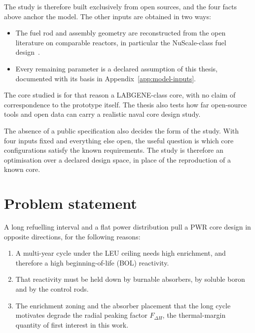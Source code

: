 The study is therefore built exclusively from open sources, and the
four facts above anchor the model. The other inputs are obtained in two
ways:

\begin{itemize}
  \item The fuel rod and assembly geometry are reconstructed from the
        open literature on comparable reactors, in particular the
        NuScale-class fuel design~\cite{nuscale_htp2_2017}.

  \item Every remaining parameter is a declared assumption of this
        thesis, documented with its basis in
        Appendix~\ref{app:model-inputs}.
\end{itemize}

The core studied is for that reason a LABGENE-class core, with no claim
of correspondence to the prototype itself. The thesis also tests how
far open-source tools and open data can carry a realistic naval core
design study.

The absence of a public specification also decides the form of the
study. With four inputs fixed and everything else open, the useful
question is which core configurations satisfy the known requirements.
The study is therefore an optimisation over a declared design space,
in place of the reproduction of a known core.

\section{Problem statement}
\label{sec:intro-problem}

A long refuelling interval and a flat power distribution pull a PWR
core design in opposite directions, for the following reasons:

\begin{enumerate}
  \item A multi-year cycle under the LEU ceiling needs high enrichment,
        and therefore a high beginning-of-life (BOL) reactivity.

  \item That reactivity must be held down by burnable absorbers, by
        soluble boron and by the control rods.

  \item The enrichment zoning and the absorber placement that the long
        cycle motivates degrade the radial peaking factor
        $F_{\Delta H}$, the thermal-margin quantity of first interest
        in this work.
\end{enumerate}

